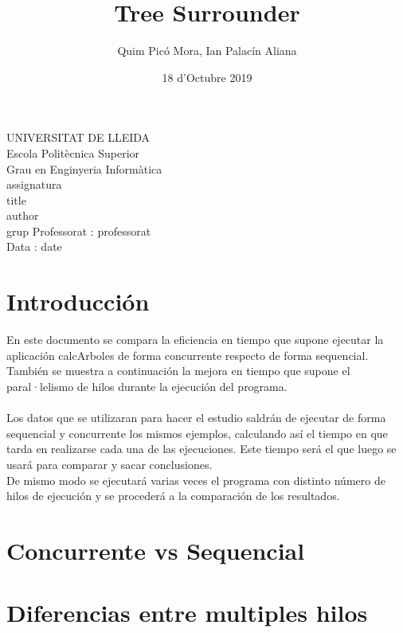 \documentclass{article}
\title{Tree Surrounder}
\author{Quim Picó Mora, Ian Palacín Aliana}
\date{18 d'Octubre 2019}
\renewcommand{\maketitle}{ %
	\begin{titlepage}
		\raggedright{UNIVERSITAT DE LLEIDA \\
			Escola Politècnica Superior \\
			Grau en Enginyeria Informàtica\\
			\1assignatura\\}
		\vspace{5cm}
		\centering\huge{\5title \\}
		\vspace{3cm}
		\large{\6author} \\
		\normalsize{\3grup}
		\vfill
		Professorat : \4professorat \\
		Data : \7date
\end{titlepage}}
\begin{document}
	\maketitle
	\thispagestyle{empty}
	
	\newpage
	\tableofcontents
	\newpage
	




\section{Introducción}

En este documento se compara la eficiencia en tiempo que supone ejecutar la aplicación calcArboles de forma concurrente respecto de forma sequencial. También se muestra a continuación la mejora en tiempo que supone el paral·lelismo de hilos durante la ejecución del programa.
\\\\
Los datos que se utilizaran para hacer el estudio saldrán de ejecutar de forma sequencial y concurrente los mismos ejemplos, calculando así el tiempo en que tarda en realizarse cada una de las ejecuciones. Este tiempo será el que luego se usará para comparar y sacar conclusiones.\\
De mismo modo se ejecutará varias veces el programa con distinto número de hilos de ejecución y se procederá a la comparación de los resultados.


\section{Concurrente vs Sequencial}

\section{Diferencias entre multiples hilos}
\end{document}
